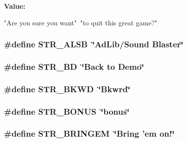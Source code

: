 \label{FOREIGN_8H_aed28a25bb4e6cca1d7b14888c9a0809b}
{\bfseries Value:}
\begin{DoxyCode}
"Are you sure you want\n"\
                "to quit this great game?"
\end{DoxyCode}
\hypertarget{FOREIGN_8H_afee683abbd8c930908f38e0359ba7ff8}{
\subsubsection[{STR\_\-ALSB}]{\setlength{\rightskip}{0pt plus 5cm}\#define STR\_\-ALSB~\char`\"{}AdLib/Sound Blaster\char`\"{}}}
\label{FOREIGN_8H_afee683abbd8c930908f38e0359ba7ff8}
\hypertarget{FOREIGN_8H_aaa5bbb109d85f4d7f3ceb174f52be963}{
\subsubsection[{STR\_\-BD}]{\setlength{\rightskip}{0pt plus 5cm}\#define STR\_\-BD~\char`\"{}Back to {\bf Demo}\char`\"{}}}
\label{FOREIGN_8H_aaa5bbb109d85f4d7f3ceb174f52be963}
\hypertarget{FOREIGN_8H_ab87bc3f1ebf52879d659e8049de19070}{
\subsubsection[{STR\_\-BKWD}]{\setlength{\rightskip}{0pt plus 5cm}\#define STR\_\-BKWD~\char`\"{}Bkwrd\char`\"{}}}
\label{FOREIGN_8H_ab87bc3f1ebf52879d659e8049de19070}
\hypertarget{FOREIGN_8H_a1f7fdbccdd4ef2af1edc8653c9150c66}{
\subsubsection[{STR\_\-BONUS}]{\setlength{\rightskip}{0pt plus 5cm}\#define STR\_\-BONUS~\char`\"{}bonus\char`\"{}}}
\label{FOREIGN_8H_a1f7fdbccdd4ef2af1edc8653c9150c66}
\hypertarget{FOREIGN_8H_ad016869b8e988020793c6648820cb7b2}{
\subsubsection[{STR\_\-BRINGEM}]{\setlength{\rightskip}{0pt plus 5cm}\#define STR\_\-BRINGEM~\char`\"{}Bring 'em on!\char`\"{}}}

